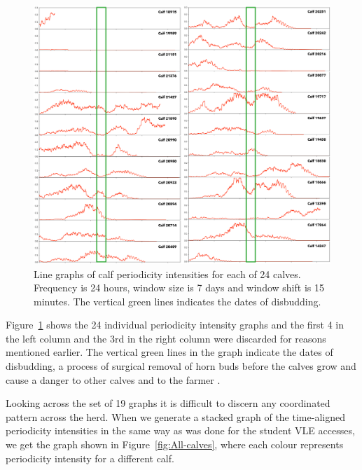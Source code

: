 \documentclass[preprints,article,accept,pdftex,moreauthors]{Definitions/mdpi}
\begin{document}
{\begin{figure}[H]
\centering
\includegraphics[width=\linewidth]{Individual-calves.png}
\caption{Line graphs of calf periodicity intensities for each of 24 calves.
Frequency is 24 hours,
window size is 7 days and window shift is 15 minutes. The vertical green lines indicates the dates of disbudding. \label{fig:Individual-calves}}
\end{figure}   

Figure~\ref{fig:Individual-calves} shows the 24 individual periodicity intensity graphs and the first 4 in the left column and the 3rd in the right column were discarded for reasons mentioned earlier. The vertical green lines in the graph indicate the dates of disbudding, a process of surgical removal of horn buds before the {calves} grow and cause a danger to other calves and to the farmer \cite{espinoza2020effect}.  

Looking across the set of 19 graphs it is difficult to discern any coordinated pattern across the herd.  When we generate a stacked  graph of the {time-aligned} periodicity intensities in the same way as was done for the student VLE accesses, we get the graph shown in Figure~\ref{fig:All-calves}, where each colour represents periodicity intensity for a different calf. 

}
\end{document}
